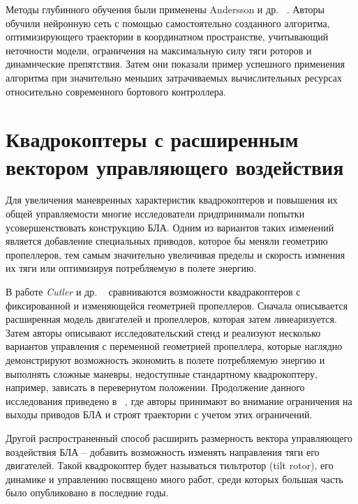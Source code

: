 Методы глубинного обучения были применены Andersson и др. ~\cite{Andersson01}. Авторы обучили нейронную сеть с помощью самостоятельно созданного алгоритма, оптимизирующего траектории в координатном пространстве, учитывающий неточности модели, ограничения на максимальную силу тяги роторов и динамические препятствия. Затем они показали пример успешного применения алгоритма при значительно меньших затрачиваемых вычислительных ресурсах относительно современного бортового контроллера.

\section{Квадрокоптеры с расширенным вектором управляющего воздействия}

Для увеличения маневренных характеристик квадрокоптеров и повышения их общей управляемости многие исследователи придпринимали попытки усовершенствовать конструкцию БЛА. Одним из вариантов таких изменений является добавление специальных приводов, которое бы меняли геометрию пропеллеров, тем самым значительно увеличивая пределы и скорость измнения их тяги или оптимизируя потребляемую в полете энергию.


В работе \textit{Cutler} и др. ~\cite{Cutler01} сравниваются возможности квадракоптеров с фиксированной и изменяющейся геометрией пропеллеров. Сначала описывается расширенная модель двигателей и пропеллеров, которая затем линеаризуется. Затем авторы описывают исследовательский стенд и реализуют несколько вариантов управления с переменной геометрией пропеллера, которые наглядно демонстрируют возможность экономить в полете потребляемую энергию и выполнять сложные маневры, недоступные стандартному квадрокоптеру, например, зависать в перевернутом положении. Продолжение данного исследования приведено в ~\cite{Cutler02}, где авторы принимают во внимание ограничения на выходы приводов БЛА и строят траектории с учетом этих ограничений.

Другой распространенный способ расширить размерность вектора управляющего воздействия БЛА -- добавить возможность изменять направления тяги его двигателей. Такой квадрокоптер будет называться тильтротор (tilt rotor), его динамике и управлению посвящено много работ, среди которых большая часть было опубликовано в последние годы.

